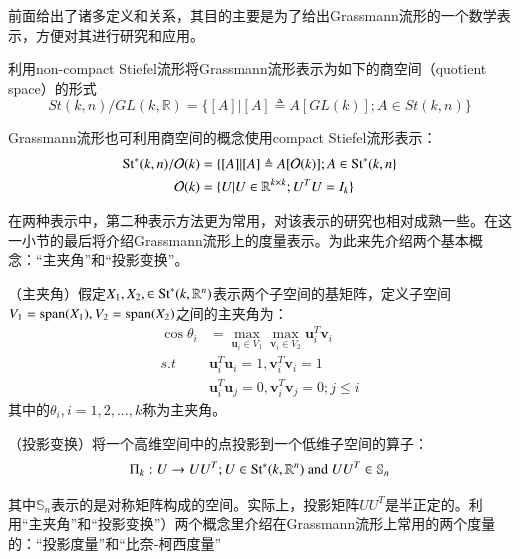 前面给出了诸多定义和关系，其目的主要是为了给出Grassmann流形的一个数学表示，方便对其进行研究和应用。
\begin{repr}
\label{non-compact-repr}
利用non-compact Stiefel流形将Grassmann流形表示为如下的商空间（quotient space）的形式
\begin{equation}
St(k,n)/GL(k,\mathbb{R})=\{[A]|[A]\triangleq A[GL(k)];A\in St(k,n)\}
\end{equation}
\end{repr}
\begin{repr}
\label{compact-repr}
Grassmann流形也可利用商空间的概念使用compact Stiefel流形表示：
\begin{equation}
\begin{split}
{\rm St}^{*}(k,n)/{\mathcal{O}}(k)&=\{[A]|[A]\triangleq A[\mathcal{O}(k)];A\in {\rm St}^{*}(k,n\}\\
\mathcal{O}(k)&=\{U|U\in \mathbb{R}^{k\times k};U^{T}U=I_k\}
\end{split}
\end{equation}
\end{repr}
在两种表示中，第二种表示方法更为常用，对该表示的研究也相对成熟一些。在这一小节的最后将介绍Grassmann流形上的度量表示。为此来先介绍两个基本概念：“主夹角”和“投影变换”。
\begin{definition}
\label{Principle_Angle}
{\heiti （主夹角）}假定$X_1,X_2,\in {\rm St}^{*}(k,\mathbb{R}^{n})$表示两个子空间的基矩阵，定义子空间$V_1={\rm{span}}(X_1),V_2={\rm{span}}(X_2)$之间的主夹角为：
\begin{equation}
\begin{split}
\cos\theta_i&=\max_{\bm{u}_i\in V_1}\max_{\bm{v}_i \in V_2}\bm{u}_{i}^{T}\bm{v}_i\\
s.t~~~~& \bm{u}_{i}^{T}\bm{u}_i=1,\bm{v}_{i}^{T}\bm{v}_i=1\\
~~~& \bm{u}_{i}^{T}\bm{u}_j=0,\bm{v}_{i}^{T}\bm{v}_j=0;j \leq i
\end{split}
\end{equation}
其中的$\theta_i,i=1,2,...,k$称为主夹角。
\end{definition}
\begin{definition}
\label{Projection}
{\heiti （投影变换）}将一个高维空间中的点投影到一个低维子空间的算子：
\begin{equation}
\Pi_k:U\rightarrow UU^{T};U \in {\rm St}^*(k,\mathbb{R}^n)\text{ and }UU^{T} \in \mathbb{S}_n
\end{equation}
\end{definition}
其中$\mathbb{S}_n$表示的是对称矩阵构成的空间。实际上，投影矩阵$UU^{T}$是半正定的。利用“主夹角”和“投影变换”）两个概念里介绍在Grassmann流形上常用的两个度量的：“投影度量”和“比奈-柯西度量”
